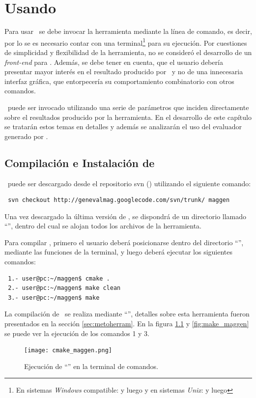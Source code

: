 \chapter{Usando \maggen}
\label{chap:usos}
\minitoc

Para usar \maggen\ se debe invocar la herramienta mediante la línea de comando, es decir, por lo se es necesario contar con una terminal\footnote{En sistemas \textit{Windows} compatible:  y luego  y en sistemas \textit{Unix}:  y luego } para su ejecución. Por cuestiones de simplicidad y flexibilidad de la herramienta, no se consideró el desarrollo de un \textit{front-end} para \maggen. Además, se debe tener en cuenta, que el usuario debería presentar mayor interés en el resultado producido por \maggen\ y no de una innecesaria interfaz gráfica, que entorpecería su comportamiento combinatorio con otros comandos.
  
\maggen\ puede ser invocado utilizando una serie de parámetros que inciden directamente sobre el resultados producido por la herramienta. En el desarrollo de este capítulo se tratarán estos temas en detalles y además se analizarán el uso del evaluador generado por \maggen.

\section{Compilación e Instalación de \maggen}
\maggen\ puede ser descargado desde el repositorio svn (\cite{svn-book}) utilizando el siguiente comando:
\begin{verbatim}
 svn checkout http://genevalmag.googlecode.com/svn/trunk/ maggen
\end{verbatim}

Una vez descargado la última versión de \maggen, se dispondrá de un directorio llamado ``'', dentro del cual se alojan todos los archivos de la herramienta.

Para compilar \maggen, primero el usuario deberá posicionarse dentro del directorio ``'', mediante las funciones de la terminal, y luego deberá ejecutar los siguientes comandos:
{\small\begin{verbatim}
 1.- user@pc:~/maggen$ cmake .
 2.- user@pc:~/maggen$ make clean
 3.- user@pc:~/maggen$ make
\end{verbatim}}
La compilación de \maggen\ se realiza mediante ``'', detalles sobre esta herramienta fueron presentados en la sección \ref{sec:metoherram}. 
En la figura \ref{fig:cmake_maggen} y \ref{fig:make_maggen} se puede ver la ejecución de los comandos 1 y 3.
\begin{figure}[!ht]\centering
\texttt{[image: cmake\_maggen.png]}
\caption{\label{fig:cmake_maggen} Ejecución de ``'' en la terminal de comandos.}
\end{figure}

